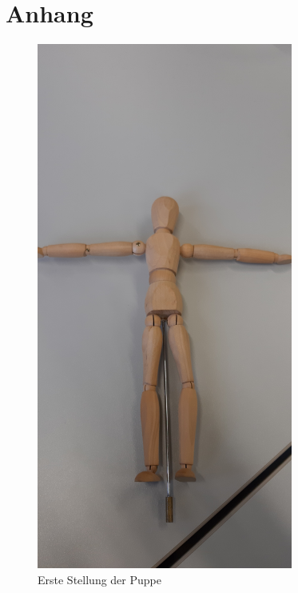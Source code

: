 \pagebreak
\section{Anhang}
\label{sec:Anhang}


\begin{figure}
    \centering
    \includegraphics[width=0.75\textwidth, angle=-90]{Bilder/Stellung1.jpg}
    \caption{Erste Stellung der Puppe}
    \label{fig:stellung1}
  \end{figure}
  
